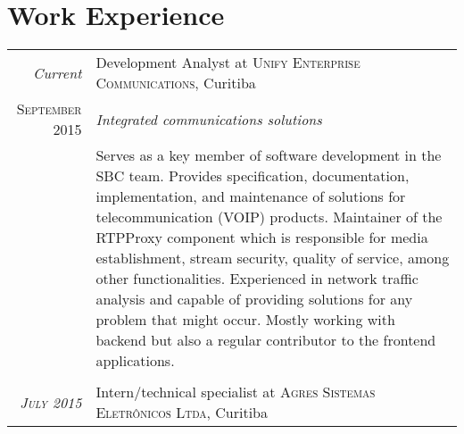 \documentclass[a4paper,10pt]{article}
\begin{document}
\section{Work Experience}
    \begin{tabular}{r|p{11cm}}
        \emph{Current}               & Development Analyst at \textsc
                                     {Unify Enterprise Communications},
                                     Curitiba \\

        \textsc{September 2015}      &\emph
                                     {Integrated communications solutions} \\
                                     &\footnotesize
                                     {
                                         Serves as a key member of software
                                         development in the SBC team. Provides
                                         specification, documentation,
                                         implementation, and maintenance of
                                         solutions for telecommunication (VOIP)
                                         products. Maintainer of the RTPProxy
                                         component which is responsible for
                                         media establishment, stream security,
                                         quality of service, among other
                                         functionalities. Experienced in network
                                         traffic analysis and capable of
                                         providing solutions for any problem
                                         that might occur. Mostly working with
                                         backend but also a regular contributor
                                         to the frontend applications.
                                     } \\
                                     \multicolumn{2}{c}{} \\

        \emph{\textsc{July 2015}}    & Intern/technical specialist at \textsc
                                     {Agres Sistemas Eletrônicos Ltda},
                                     Curitiba \\


\end{tabular}
\end{document}

